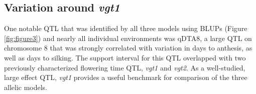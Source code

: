 \documentclass[article,9pt,twocolumn,twoside]{rilabRxiv}
\begin{document}

\subsection{Variation around \emph{vgt1}}
One notable QTL that was identified by all three models using BLUPs (Figure \ref{fig:figure3}) and nearly all individual environments was qDTA8, a large QTL on chromosome 8 that was strongly correlated with variation in days to anthesis, as well as days to silking.
The support interval for this QTL overlapped with two previously characterized flowering time QTL, \emph{vgt1} and \emph{vgt2}.
As a well-studied, large effect QTL, \emph{vgt1} provides a useful benchmark for comparison of the three allelic models.
\end{document}
